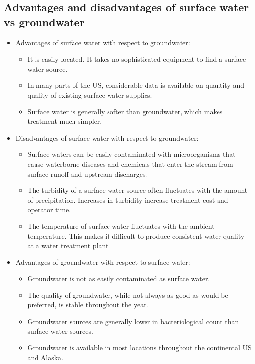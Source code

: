 \subsection{Advantages and disadvantages of surface water vs groundwater }
\begin{itemize}
\item Advantages of surface water with respect to groundwater:
\begin{itemize}
\item It is easily located. It takes no sophisticated equipment to find a surface water source.
\item In many parts of the US, considerable data is available on quantity and quality of existing surface water supplies.
\item Surface water is generally softer than groundwater, which makes treatment much simpler.
\end{itemize}
\item Disadvantages of surface water with respect to groundwater:
\begin{itemize}
\item Surface waters can be easily contaminated with microorganisms that cause waterborne diseases and chemicals that enter the stream from surface runoff and upstream discharges.
\item The turbidity of a surface water source often fluctuates with the amount of precipitation. Increases in turbidity increase treatment cost and operator time.
\item The temperature of surface water fluctuates with the ambient temperature. This makes it difficult to produce consistent water quality at a water treatment plant.
\end{itemize}
\item Advantages of groundwater with respect to surface water:\\
\begin{itemize}
\item Groundwater is not as easily contaminated as surface water.
\item The quality of groundwater, while not always as good as would be preferred, is stable throughout the year.
\item Groundwater sources are generally lower in bacteriological count than surface water sources.
\item Groundwater is available in most locations throughout the continental US and Alaska.
\end{itemize}

\end{itemize}
